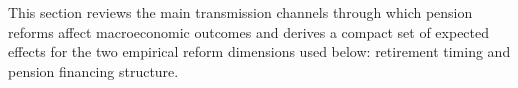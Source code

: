 \documentclass[11pt,english,a4paper, twoside, authoryear]{article}
\begin{document}



This section reviews the main transmission channels through which pension reforms affect macroeconomic outcomes and derives a compact set of expected effects for the two empirical reform dimensions used below: retirement timing and pension financing structure.





\end{document}
